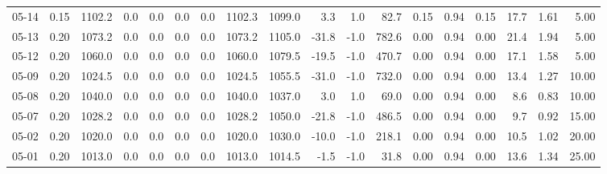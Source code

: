 \begin{threeparttable}
{\begin{tabular}{lrrrrrrrrrrrrrrrrr}
  05-14 &     0.15 & 1102.2 &               0.0 &               0.0 &                0.0 &                0.0 & 1102.3 & 1099.0 &        3.3 &                      1.0 &                82.7 &       0.15 &      0.94 &           0.15 &             17.7 &            1.61 &                   5.00 \\
  05-13 &     0.20 & 1073.2 &               0.0 &               0.0 &                0.0 &                0.0 & 1073.2 & 1105.0 &      -31.8 &                     -1.0 &               782.6 &       0.00 &      0.94 &           0.00 &             21.4 &            1.94 &                   5.00 \\
  05-12 &     0.20 & 1060.0 &               0.0 &               0.0 &                0.0 &                0.0 & 1060.0 & 1079.5 &      -19.5 &                     -1.0 &               470.7 &       0.00 &      0.94 &           0.00 &             17.1 &            1.58 &                   5.00 \\
  05-09 &     0.20 & 1024.5 &               0.0 &               0.0 &                0.0 &                0.0 & 1024.5 & 1055.5 &      -31.0 &                     -1.0 &               732.0 &       0.00 &      0.94 &           0.00 &             13.4 &            1.27 &                  10.00 \\
  05-08 &     0.20 & 1040.0 &               0.0 &               0.0 &                0.0 &                0.0 & 1040.0 & 1037.0 &        3.0 &                      1.0 &                69.0 &       0.00 &      0.94 &           0.00 &              8.6 &            0.83 &                  10.00 \\
  05-07 &     0.20 & 1028.2 &               0.0 &               0.0 &                0.0 &                0.0 & 1028.2 & 1050.0 &      -21.8 &                     -1.0 &               486.5 &       0.00 &      0.94 &           0.00 &              9.7 &            0.92 &                  15.00 \\
  05-02 &     0.20 & 1020.0 &               0.0 &               0.0 &                0.0 &                0.0 & 1020.0 & 1030.0 &      -10.0 &                     -1.0 &               218.1 &       0.00 &      0.94 &           0.00 &             10.5 &            1.02 &                  20.00 \\
  05-01 &     0.20 & 1013.0 &               0.0 &               0.0 &                0.0 &                0.0 & 1013.0 & 1014.5 &       -1.5 &                     -1.0 &                31.8 &       0.00 &      0.94 &           0.00 &             13.6 &            1.34 &                  25.00 \\

\end{tabular}}
\end{threeparttable}

